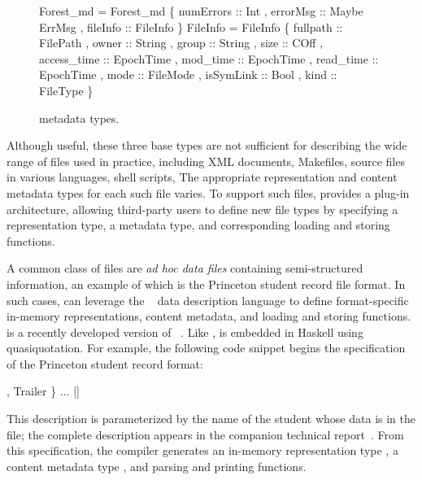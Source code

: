 \begin{figure}
\begin{centercode}
 Forest_md = Forest_md 
   \{ numErrors :: Int
   , errorMsg  :: Maybe ErrMsg
   , fileInfo  :: FileInfo \}
\mbox{}
 FileInfo = FileInfo 
   \{ fullpath    :: FilePath
   , owner       :: String
   , group       :: String
   , size        :: COff
   , access_time :: EpochTime
   , mod_time    :: EpochTime
   , read_time   :: EpochTime
   , mode        :: FileMode
   , isSymLink   :: Bool
   , kind        :: FileType \}
\end{centercode}
\caption{\forest{} metadata types.}
\label{fig:forest-md}
\end{figure}

Although useful, these three base types are not sufficient for
describing the wide range of files used in practice, including XML
documents, Makefiles, source files in various languages, shell
scripts, \etc{} The appropriate representation and content metadata
types for each such file varies. To support such files,
\forest{} provides a plug-in architecture, allowing third-party users
to define new file types by specifying a representation type, a
metadata type, and corresponding loading and storing functions.

A common class of files are \textit{ad hoc data files} containing
semi-structured information, an example of which is the Princeton
student record file format. 
In such cases, \forest{} can leverage the \padshaskell{}~\cite{fisher-walker:icdt} data
description language to define format-specific in-memory
representations, content metadata, and loading and storing functions. 
\padshaskell{} is a recently developed version of 
\pads{}~\cite{fisher+:pads,fisher+:toplas,mandelbaum+:pads-ml}.
Like \forest{}, \padshaskell{} is embedded in Haskell using
quasiquotation.  For example, the following code snippet 
begins the \pads{} specification of the Princeton student record
format: 
\noindent
\begin{code}
[pads| \kw{data} Student(name::String) = Student
            \{ person  :: Line (Person name)
            , Header  
            , courses :: [Line Course]
            , Trailer
            \} 
       ...  |]
\end{code}
This description is parameterized by the name of the student whose
data is in the file; the complete description appears in the companion
technical report~\cite{forest-techreport}.
From this specification, the \pads{} compiler
generates an in-memory representation type , a content metadata
type , and parsing and printing functions.  

